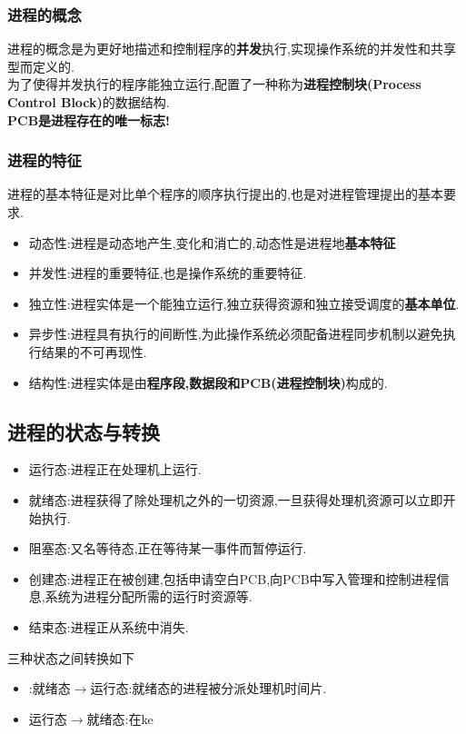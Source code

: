 \documentclass{ctexart}
\begin{document}
\subsubsection{进程的概念}
进程的概念是为更好地描述和控制程序的\textbf{并发}执行,实现操作系统的并发性和共享型而定义的.\\
为了使得并发执行的程序能独立运行,配置了一种称为\textbf{进程控制块(Process Control Block)}的数据结构.\\
\textbf{PCB是进程存在的唯一标志!}

\subsubsection{进程的特征}
进程的基本特征是对比单个程序的顺序执行提出的,也是对进程管理提出的基本要求.
\begin{itemize}
	\item 动态性:进程是动态地产生,变化和消亡的,动态性是进程地\textbf{基本特征}
	\item 并发性:进程的重要特征,也是操作系统的重要特征.
	\item 独立性:进程实体是一个能独立运行,独立获得资源和独立接受调度的\textbf{基本单位}.
	\item 异步性:进程具有执行的间断性,为此操作系统必须配备进程同步机制以避免执行结果的不可再现性.
	\item 结构性:进程实体是由\textbf{程序段,数据段和PCB(进程控制块)}构成的.
\end{itemize}
\subsection{进程的状态与转换}
\begin{itemize}
	\item 运行态:进程正在处理机上运行.
	\item 就绪态:进程获得了除处理机之外的一切资源,一旦获得处理机资源可以立即开始执行.
	\item 阻塞态:又名等待态,正在等待某一事件而暂停运行.
	\item 创建态:进程正在被创建,包括申请空白PCB,向PCB中写入管理和控制进程信息,系统为进程分配所需的运行时资源等.
	\item 结束态:进程正从系统中消失.
\end{itemize}
三种状态之间转换如下
\begin{itemize}
	\item:就绪态$\rightarrow$运行态:就绪态的进程被分派处理机时间片.
	\item 运行态$\rightarrow$就绪态:在ke
\end{itemize}
\end{document}
